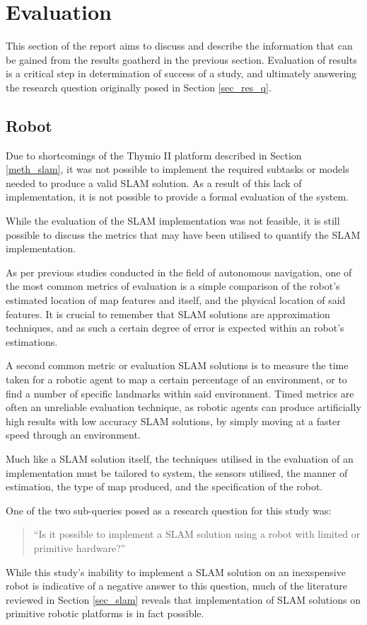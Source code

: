 \section{Evaluation}
This section of the report aims to  discuss and describe the information that
can be gained from the results goatherd in the previous section.
Evaluation of results is a critical step in determination of success of a
study, and ultimately answering the research question originally posed in
Section \ref{sec_res_q}.

\subsection{Robot}
Due to shortcomings of the Thymio II platform described in Section
\ref{meth_slam}, it was not possible to implement the required subtasks or
models needed to produce a valid SLAM solution.
As a result of this lack of implementation, it is not possible to provide a
formal evaluation of the system.

While the evaluation  of the SLAM implementation was not feasible, it is still
possible to discuss the metrics that may have been utilised to quantify the
SLAM implementation.

As per previous studies conducted in the field of autonomous navigation, one of
the most common metrics of evaluation is a simple comparison of the robot's
estimated location of map features and itself, and the physical location of
said features.
It is crucial to remember that SLAM solutions are approximation techniques,
and as such a certain degree of error is expected within an robot's
estimations.

A second common metric or evaluation SLAM solutions is to measure the time
taken for a robotic agent to map a certain percentage of an environment, or to
find a number of specific landmarks within said environment.
Timed metrics are often an unreliable evaluation technique, as robotic agents
can produce artificially high results with low accuracy SLAM solutions, by
simply moving at a faster speed through an environment.

Much like a SLAM solution itself, the techniques utilised in the evaluation of
an implementation must be tailored to system, the sensors utilised, the manner
of estimation, the type of map produced, and the specification of the robot.

One of the two sub-queries posed as a research question for this study was:
\begin{quote}
``Is it possible to implement a SLAM solution using a robot with limited or
primitive hardware?''
\end{quote}
While this study's inability to implement a SLAM solution on an inexspensive
robot is indicative of a negative answer to this question, much of the
literature reviewed in Section \ref{sec_slam} reveals that implementation of
SLAM solutions on primitive robotic platforms is in fact possible.

